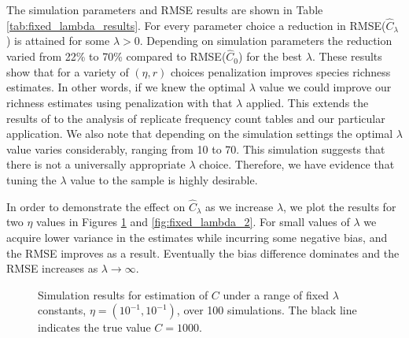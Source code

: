 \documentclass[oupdraft]{bio}
\begin{document}
The simulation parameters and RMSE results are shown in Table \ref{tab:fixed_lambda_results}.  For every parameter choice a reduction in RMSE($\widehat{C}_{\lambda}$) is attained for some $\lambda > 0$.  Depending on simulation parameters the reduction varied from 22\% to 70\% compared to RMSE($\widehat{C}_{0}$) for the best $\lambda$.  These results show that for a variety of $(\eta, r)$ choices penalization improves species richness estimates.  In other words, if we knew the optimal $\lambda$ value we could improve our richness estimates using penalization with that $\lambda$ applied.  This extends the results of \citet{wang_2005} to the analysis of replicate frequency count tables and our particular application.  We also note that depending on the simulation settings the optimal $\lambda$ value varies considerably, ranging from 10 to 70.  This simulation suggests that there is not a universally appropriate $\lambda$ choice.  Therefore, we have evidence that tuning the $\lambda$ value to the sample is highly desirable.

In order to demonstrate the effect on $\widehat{C}_{\lambda}$ as we increase $\lambda$, we plot the results for two $\eta$ values in Figures \ref{fig:fixed_lambda} and \ref{fig:fixed_lambda_2}.  For small values of $\lambda$ we acquire lower variance in the estimates while incurring some negative bias, and the RMSE improves as a result.  Eventually the bias difference dominates and the RMSE increases as $\lambda \to \infty$.


\begin{figure}[p]
\caption{Simulation results for estimation of $C$ under a range of fixed $\lambda$ constants, $\eta = (10^{-1}, 10^{-1})$, over 100 simulations. The black line indicates the true value $C = 1000$.
\label{fig:fixed_lambda}}
\centering{}
\end{figure}
\end{document}
